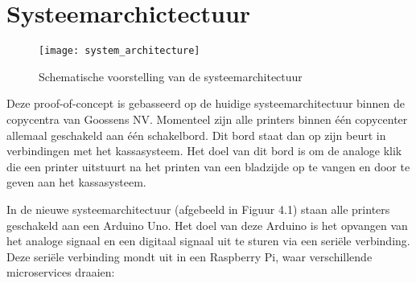 \section{Systeemarchictectuur}
\begin{figure}[H]
    \texttt{[image: system\_architecture]}
    \centering
    \caption{Schematische voorstelling van de systeemarchitectuur}
    \label{fig:systemArchitecture}
\end{figure}

Deze proof-of-concept is gebasseerd op de huidige systeemarchitectuur binnen de copycentra van Goossens NV. Momenteel zijn alle printers binnen één copycenter allemaal geschakeld aan één schakelbord. Dit bord staat dan op zijn beurt in verbindingen met het kassasysteem. Het doel van dit bord is om de analoge klik die een printer uitstuurt na het printen van een bladzijde op te vangen en door te geven aan het kassasysteem.

In de nieuwe systeemarchitectuur (afgebeeld in Figuur 4.1) staan alle printers geschakeld aan een Arduino Uno. Het doel van deze Arduino is het opvangen van het analoge signaal en een digitaal signaal uit te sturen via een seriële verbinding. Deze seriële verbinding mondt uit in een Raspberry Pi, waar verschillende microservices draaien:


